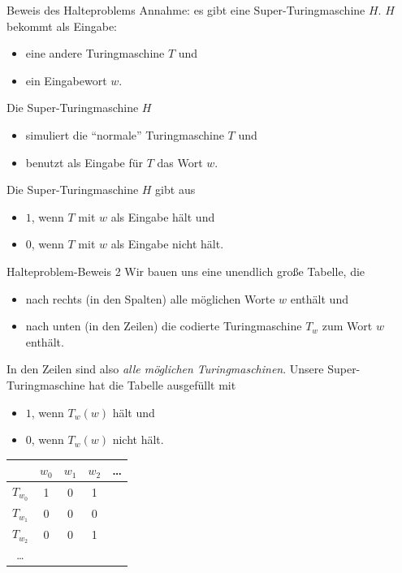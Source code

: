 \begin{frame}{Beweis des Halteproblems}
    Annahme: es gibt eine Super-Turingmaschine $H$. $H$ bekommt als Eingabe:
    \begin{itemize}
        \item eine andere Turingmaschine $T$ und
        \item ein Eingabewort $w$.
    \end{itemize}
    \pause
    Die Super-Turingmaschine $H$ 
    \begin{itemize}
        \item simuliert die ``normale'' Turingmaschine $T$ und
        \item benutzt als Eingabe für $T$ das Wort $w$.
    \end{itemize}
    \pause
    Die Super-Turingmaschine $H$ gibt aus
    \begin{itemize}
        \item $1$, wenn $T$ mit $w$ als Eingabe hält und
        \item $0$, wenn $T$ mit $w$ als Eingabe nicht hält.
    \end{itemize}
\end{frame}
\begin{frame}{Halteproblem-Beweis 2}
    Wir bauen uns eine unendlich große Tabelle, die
    \begin{itemize}
        \item nach rechts (in den Spalten) alle möglichen Worte $w$ enthält und
        \item nach unten (in den Zeilen) die codierte Turingmaschine $T_w$ zum Wort $w$ enthält.
    \end{itemize}
    In den Zeilen sind also \emph{alle möglichen Turingmaschinen}.
    \pause
    Unsere Super-Turingmaschine hat die Tabelle ausgefüllt mit
    \begin{itemize}
        \item $1$, wenn $T_w\left( w \right)$ hält und
        \item $0$, wenn $T_w\left( w \right)$ nicht hält.
    \end{itemize}
    \pause
    \begin{table}
        \centering
        \begin{tabular}{ccccl}
            \toprule
                     & $w_0$ & $w_1$ & $w_2$ & \dots\\
             \midrule
             $T_{w_0}$ & 1 & 0 & 1 & \\
             $T_{w_1}$ & 0 & 0 & 0 & \\
             $T_{w_2}$ & 0 & 0 & 1 & \\
             \dots   &  &   &   &  \\
             \bottomrule
        \end{tabular}
    \end{table}
\end{frame}
